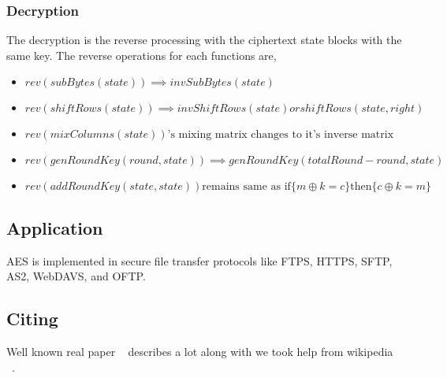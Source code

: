 \subsubsection{Decryption}
The decryption is the reverse processing with the ciphertext state blocks with the same key. The reverse operations for each functions are,
\begin{itemize}
\item $ rev(subBytes(state)) \implies invSubBytes(state)$
\item $ rev(shiftRows(state)) \implies invShiftRows(state) or shiftRows(state, right) $
\item $ rev(mixColumns(state)) \text{'s mixing matrix changes to it's inverse matrix} $
\item $ rev(genRoundKey(round, state)) \implies genRoundKey(totalRound - round, state) $
\item $ rev(addRoundKey(state, state)) \text{remains same as if} \{m \oplus k = c\} \text{then} \{c \oplus k = m\} $
\end{itemize}

\subsection{Application}
AES is implemented in secure file transfer protocols like FTPS, HTTPS, SFTP, AS2, WebDAVS, and OFTP.

\subsection{Citing}
Well known real paper ~\cite{rijndael_aes} describes a lot along with we took help from wikipedia ~\cite{wiki_aes}.
